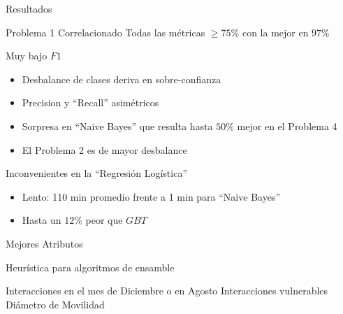 \documentclass[xcolor=x11names]{beamer}
\begin{document}
\begin{frame}{Resultados}

	\begin{block}{ Problema 1 Correlacionado}
		Todas las métricas $\geq 75\%$ con la mejor en $97\%$
	\end{block}

	\begin{block}{Muy bajo $F1$}
		\begin{itemize}[]
			\item Desbalance de clases deriva en sobre-confianza
			\item Precision y ``Recall'' asimétricos
			\item Sorpresa en ``Naive Bayes'' que resulta hasta $50\%$ mejor en el Problema 4
			\item El Problema 2 es de mayor desbalance
		\end{itemize}
	\end{block}

\begin{block}{Inconvenientes en la ``Regresión Logística''}
	\begin{itemize}[]
		\item Lento: 110 min promedio frente a 1 min para ``Naive Bayes''
		\item Hasta un $12\%$ peor que $GBT$
	\end{itemize}
\end{block}

\end{frame}


\begin{frame}{Mejores Atributos}

		Heurística para algoritmos de ensamble

			\bigskip
			Interacciones en el mes de Diciembre o en Agosto
			\medskip
			Interacciones vulnerables
			\medskip
			Diámetro de Movilidad

\end{frame}

\end{document}
